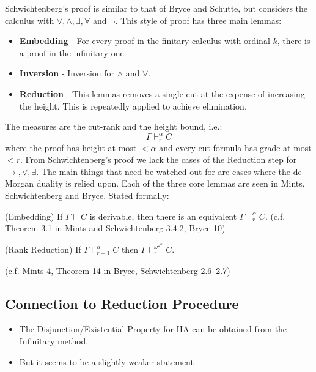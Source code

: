 Schwichtenberg's proof is similar to that of Bryce and Schutte, but considers the calculus with $\lor, \land, \exists, \forall$ and $\lnot$. This style of proof has three main lemmas:
\begin{itemize}
    \item \textbf{Embedding} - For every proof in the finitary calculus with ordinal $k$, there is a proof in the infinitary one.
    \item \textbf{Inversion} - Inversion for $\land$ and $\forall$.
    \item \textbf{Reduction} - This lemmas removes a single cut at the expense of increasing the height. This is repeatedly applied to achieve elimination.
\end{itemize}
The measures are the cut-rank and the height bound, i.e.:
\[ \Gamma \vdash^\alpha_r C \]
where the proof has height at most $< \alpha$ and every cut-formula has grade at most $< r$. From Schwichtenberg's proof we lack the cases of the Reduction step for $\to, \lor, \exists$. The main things that need be watched out for are cases where the de Morgan duality is relied upon. Each of the three core lemmas are seen in Mints, Schwichtenberg and Bryce. Stated formally:

\begin{cththeorem}{(Embedding)}
If $\Gamma \vdash C$ is derivable, then there is an equivalent
$\Gamma \vdash^{\alpha}_{r} C$. 
(c.f. Theorem 3.1 in Mints and Schwichtenberg 3.4.2, Bryce 10)
\end{cththeorem}

\begin{cththeorem}{(Rank Reduction)}
If $\Gamma \vdash^{\alpha}_{r+1} C$ then
$\Gamma \vdash^{\omega^{\omega^{\alpha}}}_{r} C$.

(c.f. Mints 4, Theorem 14 in Bryce, Schwichtenberg 2.6–2.7)
\end{cththeorem}

\subsection{Connection to Reduction Procedure}

\begin{itemize}
    \item The Disjunction/Existential Property for HA can be obtained from the Infinitary method.
    \item But it seems to be a slightly weaker statement
\end{itemize}

